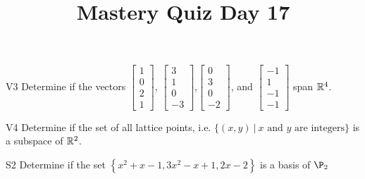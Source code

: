 \documentclass{sbgLAquiz}
\title{Mastery Quiz Day 17 }
\begin{document}
\begin{problem}{V3}
Determine if the vectors $\begin{bmatrix} 1 \\ 0 \\ 2 \\1 \end{bmatrix}$, $\begin{bmatrix} 3 \\ 1 \\ 0 \\ -3 \end{bmatrix}$,$\begin{bmatrix} 0 \\ 3 \\ 0 \\ -2 \end{bmatrix}$, and $\begin{bmatrix}-1 \\ 1 \\ -1 \\ -1 \end{bmatrix}$ span $\mathbb{R}^4$.
\end{problem}

\begin{problem}{V4}
Determine if the set of all lattice points, i.e. $\{(x,y)\ \big|\ \text{$x$ and $y$ are integers} \}$ is a subspace of $\mathbb{R}^2$.
\end{problem}
\newpage

\begin{problem}{S2}
Determine if the set $\left\{ x^2+x-1, 3x^2-x+1, 2x-2 \right\}$ is a basis of $\P_2$
\end{problem}
\end{document}
